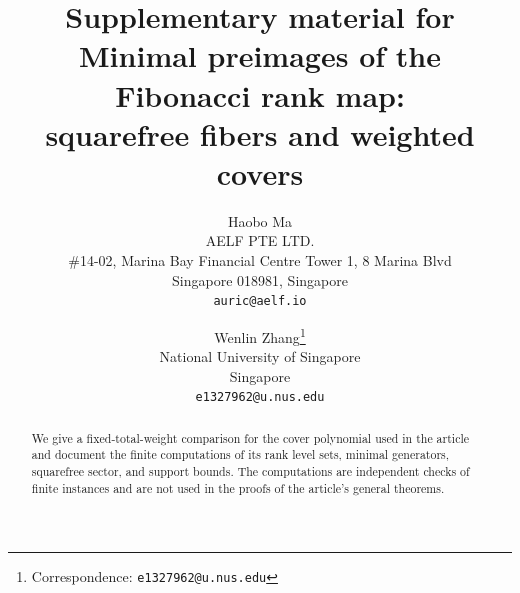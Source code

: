 \documentclass[11pt,letterpaper]{article}
\title{Supplementary material for Minimal preimages of the Fibonacci rank map:\\
squarefree fibers and weighted covers}
\author{
Haobo Ma\\
AELF PTE LTD.\\
\#14-02, Marina Bay Financial Centre Tower 1, 8 Marina Blvd\\
Singapore 018981, Singapore\\
\texttt{auric@aelf.io}
\and
Wenlin Zhang\thanks{Correspondence: \texttt{e1327962@u.nus.edu}}\\
National University of Singapore\\
Singapore\\
\texttt{e1327962@u.nus.edu}
}
\date{}
\begin{document}
\maketitle

\begin{abstract}
We give a fixed-total-weight comparison for the cover polynomial used in the
article and document the finite computations of its rank level sets, minimal
generators, squarefree sector, and support bounds.  The computations are
independent checks of finite instances and are not used in the proofs of the
article's general theorems.
\end{abstract}



\end{document}
